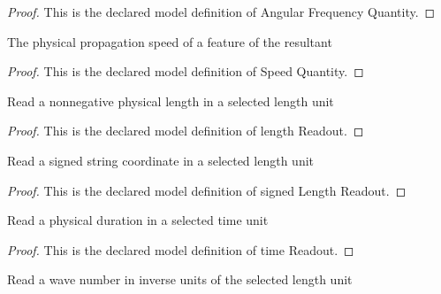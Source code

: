 \begin{proof}
  This is the declared model definition of Angular Frequency Quantity.
\end{proof}
\begin{definition}
  \label{def:physics:phyx-mini-0294:phyxminiproblems-problemphyxmini0294-speedquantity}
  The physical propagation speed of a feature of the resultant
\end{definition}
\begin{proof}
  This is the declared model definition of Speed Quantity.
\end{proof}
\begin{definition}
  \label{def:physics:phyx-mini-0294:phyxminiproblems-problemphyxmini0294-lengthreadout}
  Read a nonnegative physical length in a selected length unit
\end{definition}
\begin{proof}
  This is the declared model definition of length Readout.
\end{proof}
\begin{definition}
  \label{def:physics:phyx-mini-0294:phyxminiproblems-problemphyxmini0294-signedlengthreadout}
  Read a signed string coordinate in a selected length unit
\end{definition}
\begin{proof}
  This is the declared model definition of signed Length Readout.
\end{proof}
\begin{definition}
  \label{def:physics:phyx-mini-0294:phyxminiproblems-problemphyxmini0294-timereadout}
  Read a physical duration in a selected time unit
\end{definition}
\begin{proof}
  This is the declared model definition of time Readout.
\end{proof}
\begin{definition}
  \label{def:physics:phyx-mini-0294:phyxminiproblems-problemphyxmini0294-wavenumberreadout}
  Read a wave number in inverse units of the selected length unit
\end{definition}
